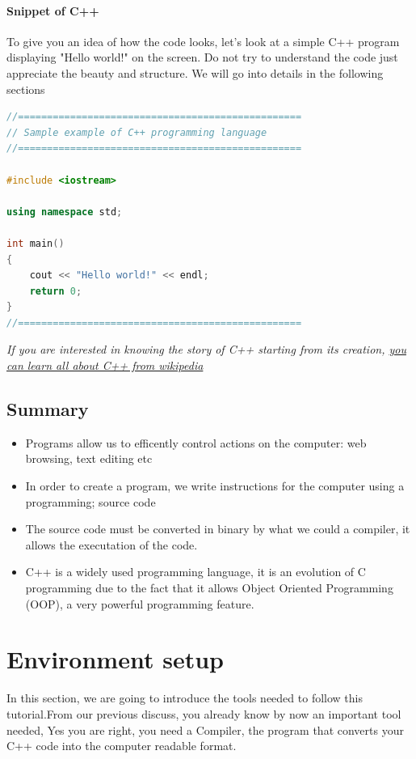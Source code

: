 \documentclass[11pt, a4paper]{article}
\begin{document}
\paragraph{Snippet of C++}
To give you an idea of how the code looks, let's look at a simple C++ program displaying "Hello world!"
on the screen. Do not try to understand the code just appreciate the beauty and structure. We will
go into details in the following sections

\begin{lstlisting}[caption=Sample example of C++ programming language, style=chstyle,
    language=C++, label = c-sample]
//=================================================
// Sample example of C++ programming language
//=================================================

#include <iostream>

using namespace std;

int main()
{
    cout << "Hello world!" << endl;
    return 0;
}
//=================================================
\end{lstlisting}
\textit{ If you are interested in knowing the story of C++ starting from its creation,
\href{https://en.wikipedia.org/wiki/Bjarne_Stroustrup}{you can learn all about C++ from wikipedia}}

\subsection{Summary}
\begin{itemize}
    \item Programs allow us to efficently control actions on the computer: web browsing, text editing etc
    \item In order to create a program, we write instructions for the computer using a programming; source code
    \item The source code must be converted in binary by what we could a compiler, it allows the executation 
    of the code.
    \item  C++ is a widely used programming language, it is an evolution of C programming due to the fact that 
    it allows Object Oriented Programming (OOP), a very powerful programming feature.
\end{itemize}
\newpage

\section{Environment setup}
In this section, we are going to introduce the tools needed to follow
this tutorial.From our previous discuss, you already know by now an important
tool needed, Yes you are right, you need a Compiler, the program that
converts your C++ code into the computer readable format.
\end{document}
